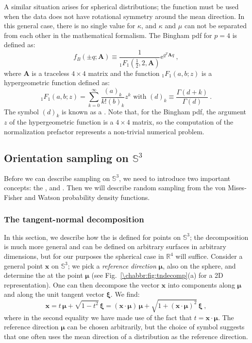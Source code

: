 A similar situation arises for spherical distributions; the  function must be used when the data does not have rotational symmetry around the mean direction.  In this general case, there is no single value for $\kappa$, and $\kappa$ and $\mu$ can not be separated from each other in the mathematical formalism. The Bingham pdf for $p=4$ is defined as:
\begin{equation}
	f_B(\pm q;\mathbf{A})\equiv \frac{1}{{}_1F_1\left(\frac{1}{2},2,\mathbf{A}\right)}\mathrm{e}^{q^T\mathbf{A}q}\ ,
\end{equation}
where $\mathbf{A}$ is a traceless $4\times 4$ matrix and the function ${}_1F_1(a,b;z)$ is a hypergeometric function defined as:
\[
	{}_1F_1(a,b;z) = \sum_{k=0}^{\infty}\frac{(a)_k}{k!(b)_k}z^k\text{ with } (d)_k\equiv\frac{\Gamma(d+k)}{\Gamma(d)}\ .
\]
The symbol $(d)_k$ is known as a .  Note that, for the Bingham pdf, the argument $z$ of the hypergeometric function is a $4\times 4$ matrix, so the computation of the normalization prefactor represents a non-trivial numerical problem.  

\subsection{Orientation sampling on $\mathbb{S}^3$}\label{\chabbr:ssec:orsamplings3}
Before we can describe sampling on $\mathbb{S}^3$, we need to introduce two important concepts: the , and .  Then we will describe random sampling from the von Mises-Fisher and Watson probability density functions.

\subsubsection{The tangent-normal decomposition}
In this section, we describe how the  is defined for points on $\mathbb{S}^3$; the decomposition is much more general and can be defined on arbitrary surfaces in arbitrary dimensions, but for our purposes the spherical case in $\mathbb{R}^4$ will suffice. Consider a general point $\mathbf{x}$ on $\mathbb{S}^3$; we pick a \textit{reference direction} $\bm{\mu}$, also on the sphere, and determine the  at the point $\bm{\mu}$ (see Fig.~\ref{\chabbr:fig:tndecomp}(a) for a 2D representation).  One can then decompose the vector $\mathbf{x}$ into components along $\bm{\mu}$ and along the unit tangent vector $\bm{\xi}$. We find:
\begin{equation}
	\mathbf{x}= t\,\bm{\mu} + \sqrt{1-t^2}\,\bm{\xi}= (\mathbf{x}\cdot\bm{\mu})\,\bm{\mu} + \sqrt{1+(\mathbf{x}\cdot\bm{\mu})^2}\,\bm{\xi}\ ,
\end{equation}
where in the second equality we have made use of the fact that $t=\mathbf{x}\cdot\bm{\mu}$. The reference direction $\bm{\mu}$ can be chosen arbitrarily, but the choice of symbol suggests that one often uses the mean direction of a distribution as the reference direction. 

